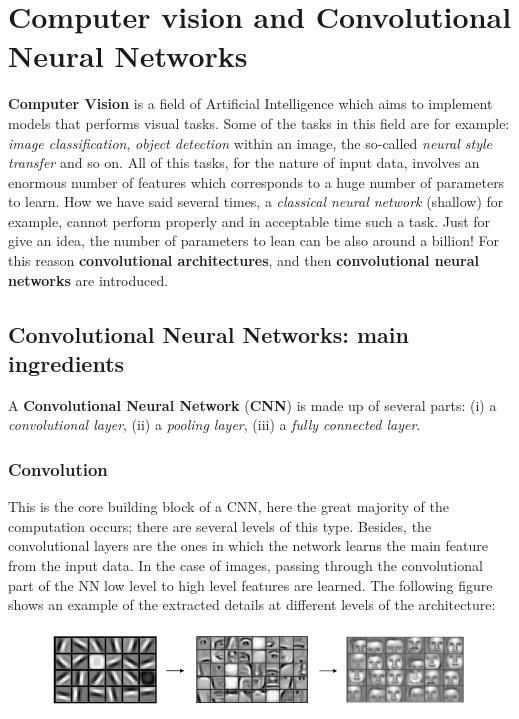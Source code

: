 \chapter[Computer vision and CNN]{Computer vision and Convolutional Neural Networks}

\textbf{Computer Vision} is a field of Artificial Intelligence which aims to implement models that performs visual tasks. Some of the tasks in this field are for example: \textit{image classification}, \textit{object detection} within an image, the so-called \textit{neural style transfer} and so on. All of this tasks, for the nature of input data, involves an enormous number of features which corresponds to a huge number of parameters to learn. How we have said several times, a \textit{classical neural network} (shallow) for example, cannot perform properly and in acceptable time such a task. Just for give an idea, the number of parameters to lean can be also around a billion! For this reason \textbf{convolutional architectures}, and then \textbf{convolutional neural networks} are introduced.

\section{Convolutional Neural Networks: main ingredients}
A \textbf{Convolutional  Neural Network} (\textbf{CNN}) is made up of several parts: (i) a \textit{convolutional layer}, (ii) a \textit{pooling layer}, (iii) a \textit{fully connected layer}.

\subsection{Convolution}
This is the core building block of a CNN, here the great majority of the computation occurs; there are several levels of this type. Besides, the convolutional layers are the ones in which the network learns the main feature from the input data. In the case of images, passing through the convolutional part of the NN low level to high level features are learned. The following figure shows an example of the extracted details at different levels of the architecture:

\begin{figure}[h]
    \centering
    \includegraphics[scale=0.8]{img/CNN_example.png} 
\end{figure}

